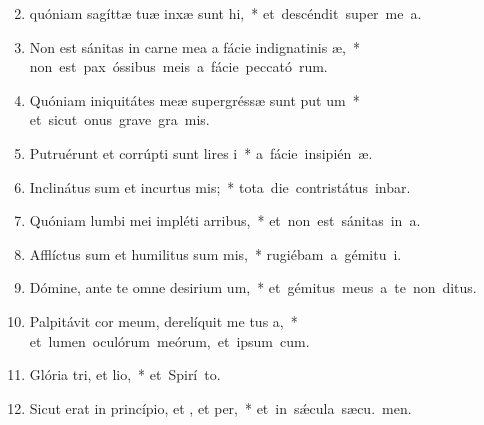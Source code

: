 \begin{flushleft}
\begin{enumerate}[leftmargin=*]
\setcounter{enumi}{1}

\item quóniam sagíttæ tuæ inxæ sunt hi,~* \mbox{et descéndit super me  a.}

\item Non est sánitas in carne mea a fácie indignatinis æ,~* \mbox{non est pax óssibus meis a fácie peccató rum.}

\item Quóniam iniquitátes meæ supergréssæ sunt put um~* \mbox{et sicut onus grave gra  mis.}

\item Putruérunt et corrúpti sunt lires i~* \mbox{a fácie insipién æ.}

\item Inclinátus sum et incurtus mis;~* \mbox{tota die contristátus inbar.}

\item Quóniam lumbi mei impléti  arribus,~* \mbox{et non est sánitas in  a.}

\item Afflíctus sum et humilitus sum mis,~* \mbox{rugiébam a gémitu  i.}

\item Dómine, ante te omne desirium um,~* \mbox{et gémitus meus a te non  ditus.}

\item Palpitávit cor meum, derelíquit me tus a,~* \mbox{et lumen oculórum meórum, et ipsum   cum.}

\item Glória tri, et lio,~* \mbox{et Spirí to.}

\item Sicut erat in princípio, et , et per,~* \mbox{et in s\'{\ae}cula sæcu. men.}

\end{enumerate}
\end{flushleft}

